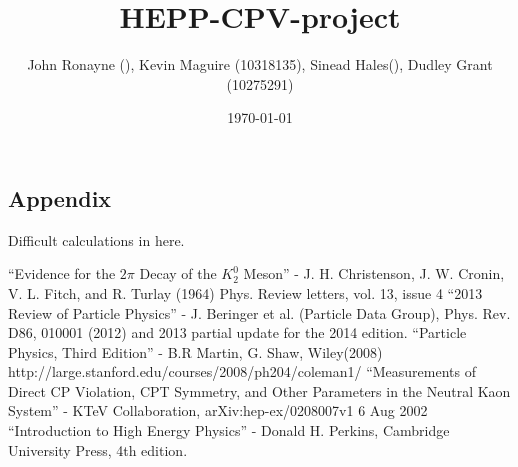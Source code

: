 \documentclass[floatfix,aps,prd,amsmath,amssymb]{revtex4}
\begin{document}
\title{HEPP-CPV-project}
\author{John Ronayne (), Kevin Maguire (10318135), Sinead Hales(), Dudley Grant (10275291)}
\date{\today}

\begin{abstract}
\textit{}
\end{abstract}

\maketitle
{}
 












\begin{appendix}
\section{Appendix}
Difficult calculations in here.
\end{appendix}
 
\begin{thebibliography}{10}
``Evidence for the $2 \pi$ Decay of the $K^0_2$ Meson'' - J. H. Christenson, J. W. Cronin, V. L. Fitch, and R. Turlay (1964) Phys. Review letters, vol. 13, issue 4
``2013 Review of Particle Physics'' - J. Beringer et al. (Particle Data Group), Phys. Rev. D86, 010001 (2012) and 2013 partial update for the 2014 edition.
``Particle Physics, Third Edition'' - B.R Martin, G. Shaw, Wiley(2008)  
http://large.stanford.edu/courses/2008/ph204/coleman1/  
``Measurements of Direct CP Violation, CPT Symmetry, and Other Parameters in the Neutral Kaon System'' - KTeV Collaboration, arXiv:hep-ex/0208007v1 6 Aug 2002
``Introduction to High Energy Physics'' - Donald H. Perkins, Cambridge University Press, 4th edition.

\end{thebibliography}
\end{document}
